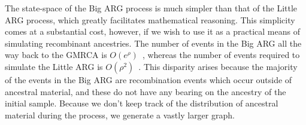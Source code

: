 \documentclass{article}
\begin{document}
The state-space of the Big ARG process is much simpler than that of the Little ARG process,
which greatly facilitates mathematical reasoning. This simplicity comes at a
substantial cost, however, if we wish to use it as a practical means of
simulating recombinant ancestries.
The number of events in the Big ARG all the way back to the GMRCA
is $O(e^\rho)$~\citep{griffiths1997ancestral}, whereas the number
of events required to simulate the Little ARG is
$O(\rho^2)$~\citep{hein2004gene,baumdicker2021efficient}.
This disparity arises because the majority of the events in the Big ARG are
recombination events which occur outside of ancestral material,
and these do not have any bearing on the ancestry of the initial sample.
Because we don't keep track of the distribution of ancestral material during the process,
we generate a vastly larger graph.
\end{document}

